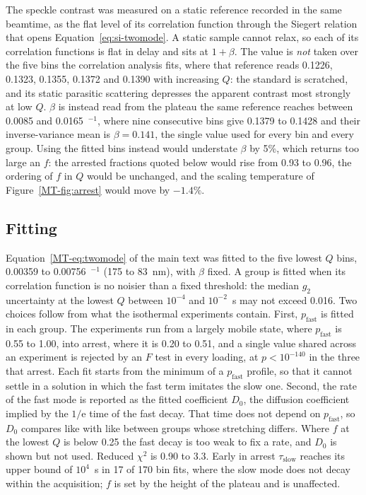 \documentclass[11pt]{article}
\newcommand{\Ainv}{\text{\AA}$^{-1}$}
\begin{document}
The speckle contrast was measured on a static reference recorded in the same beamtime, as the flat level of its correlation function through the Siegert relation that opens Equation~\ref{eq:si-twomode}. A static sample cannot relax, so each of its correlation functions is flat in delay and sits at $1+\beta$. The value is \emph{not} taken over the five bins the correlation analysis fits, where that reference reads 0.1226, 0.1323, 0.1355, 0.1372 and 0.1390 with increasing $Q$: the standard is scratched, and its static parasitic scattering depresses the apparent contrast most strongly at low $Q$. $\beta$ is instead read from the plateau the same reference reaches between 0.0085 and 0.0165~\Ainv, where nine consecutive bins give 0.1379 to 0.1428 and their inverse-variance mean is $\beta=0.141$, the single value used for every bin and every group. Using the fitted bins instead would understate $\beta$ by 5\%, which returns too large an $f$: the arrested fractions quoted below would rise from 0.93 to 0.96, the ordering of $f$ in $Q$ would be unchanged, and the scaling temperature of Figure~\ref*{MT-fig:arrest} would move by $-1.4\%$.

\subsection{Fitting}
\label{sec:tdepfit}
Equation~\ref*{MT-eq:twomode} of the main text was fitted to the five lowest $Q$ bins, 0.00359 to 0.00756~\Ainv{} (175 to \SI{83}{\nano\meter}), with $\beta$ fixed. A group is fitted when its correlation function is no noisier than a fixed threshold: the median $g_2$ uncertainty at the lowest $Q$ between $10^{-4}$ and $10^{-2}$~s may not exceed 0.016. Two choices follow from what the isothermal experiments contain. First, $p_{\mathrm{fast}}$ is fitted in each group. The experiments run from a largely mobile state, where $p_{\mathrm{fast}}$ is 0.55 to 1.00, into arrest, where it is 0.20 to 0.51, and a single value shared across an experiment is rejected by an $F$ test in every loading, at $p<10^{-140}$ in the three that arrest. Each fit starts from the minimum of a $p_{\mathrm{fast}}$ profile, so that it cannot settle in a solution in which the fast term imitates the slow one. Second, the rate of the fast mode is reported as the fitted coefficient $D_0$, the diffusion coefficient implied by the $1/\mathrm{e}$ time of the fast decay. That time does not depend on $p_{\mathrm{fast}}$, so $D_0$ compares like with like between groups whose stretching differs. Where $f$ at the lowest $Q$ is below 0.25 the fast decay is too weak to fix a rate, and $D_0$ is shown but not used. Reduced $\chi^2$ is 0.90 to 3.3. Early in arrest $\tau_{\mathrm{slow}}$ reaches its upper bound of $10^4$~s in 17 of 170 bin fits, where the slow mode does not decay within the acquisition; $f$ is set by the height of the plateau and is unaffected.
\end{document}
